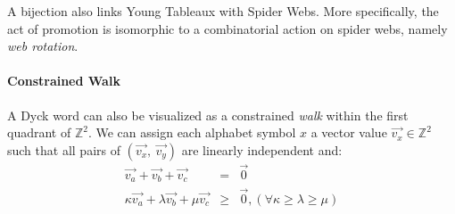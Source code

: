 \documentclass{llncs}
\begin{document}
A bijection also links Young Tableaux with Spider Webs. More specifically, the act of promotion is isomorphic to a combinatorial action on spider webs, namely \textit{web rotation}\cite{petersen}.

\paragraph{\textbf{Constrained Walk}}
A Dyck word can also be visualized as a constrained \textit{walk} within the first quadrant of $\mathbb{Z}^2$. We can assign each alphabet symbol $x$ a vector value $\vec{v_x} \in \mathbb{Z}^2$ such that all pairs of $(\vec{v_x},\ \vec{v_y})$ are linearly independent and:
\begin{eqnarray}
\vec{v_a} + \vec{v_b} + \vec{v_c} &=& \vec{0} \\
\kappa\vec{v_a} + \lambda\vec{v_b} + \mu\vec{v_c} &\geq & \vec{0},  (\forall \kappa \geq \lambda \geq \mu)
\end{eqnarray}
\end{document}
